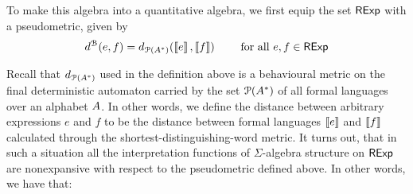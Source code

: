 To make this algebra into a quantitative algebra, we first equip the set $\mathsf{RExp}$ with a pseudometric, given by 
\begin{equation}\label{c2:eq:qalg_dist}
	d^{\mathcal{B}}(e,f) = d_{\mathcal{P}({A}^{\ast})}(\left\llbracket{e}\right\rrbracket, \left\llbracket{f}\right\rrbracket) \qquad \text{ for all } e, f \in \mathsf{RExp}
\end{equation}

Recall that $d_{\mathcal{P}({A}^{\ast})}$ used in the definition above is a behavioural metric on the final deterministic automaton carried by the set $\mathcal{P} ({A}^{\ast})$ of all formal languages over an alphabet ${A}$. In other words, we define the distance between arbitrary expressions $e$ and $f$ to be the distance between formal languages $\left\llbracket{e}\right\rrbracket$ and $\left\llbracket{f}\right\rrbracket$ calculated through the shortest-distinguishing-word metric. 
It turns out, that in such a situation all the interpretation functions of $\Sigma$-algebra structure on $\mathsf{RExp}$ are nonexpansive with respect to the pseudometric defined above. In other words, we have that: 

